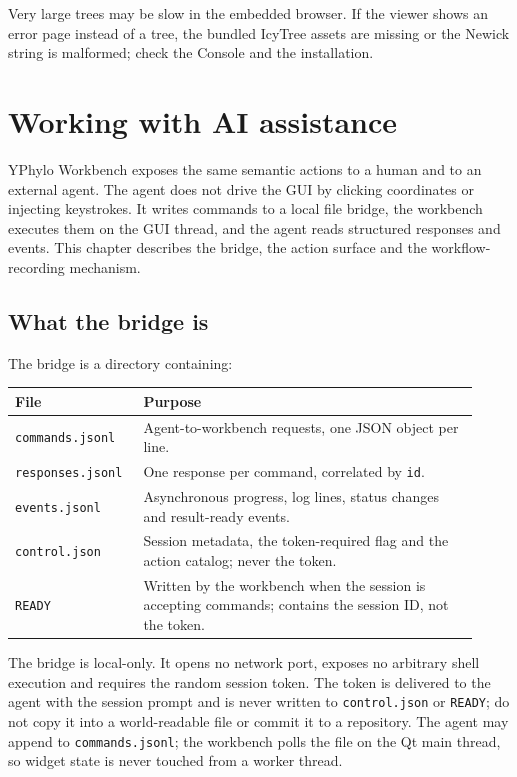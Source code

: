 \documentclass[10pt]{report}
\begin{document}
Very large trees may be slow in the embedded browser. If the viewer shows an
error page instead of a tree, the bundled IcyTree assets are missing or the
Newick string is malformed; check the Console and the installation.

\chapter{Working with AI assistance}
\label{ch:ai-assistance}

YPhylo Workbench exposes the same semantic actions to a human and to an
external agent. The agent does not drive the GUI by clicking coordinates or
injecting keystrokes. It writes commands to a local file bridge, the workbench
executes them on the GUI thread, and the agent reads structured responses and
events. This chapter describes the bridge, the action surface and the
workflow-recording mechanism.

\section{What the bridge is}

The bridge is a directory containing:

\begin{longtable}{@{}>{\raggedright\arraybackslash}p{0.24\linewidth}
                      >{\raggedright\arraybackslash}p{0.68\linewidth}@{}}
\toprule
File & Purpose \\
\midrule
\endhead
\texttt{commands.jsonl} & Agent-to-workbench requests, one JSON object per
line. \\
\texttt{responses.jsonl} & One response per command, correlated by
\texttt{id}. \\
\texttt{events.jsonl} & Asynchronous progress, log lines, status changes and
result-ready events. \\
\texttt{control.json} & Session metadata, the token-required flag and the
action catalog; never the token. \\
\texttt{READY} & Written by the workbench when the session is accepting
commands; contains the session ID, not the token. \\
\bottomrule
\end{longtable}

The bridge is local-only. It opens no network port, exposes no arbitrary shell
execution and requires the random session token. The token is delivered to the
agent with the session prompt and is never written to \texttt{control.json} or
\texttt{READY}; do not copy it into a world-readable file or commit it to a
repository.
The agent may append to \texttt{commands.jsonl}; the workbench polls the file
on the Qt main thread, so widget state is never touched from a worker thread.
\end{document}
